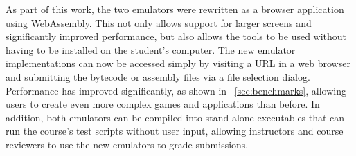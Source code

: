 As part of this work, the two emulators were rewritten as a browser application using WebAssembly. This not only allows support for larger screens and significantly improved performance, but also allows the tools to be used without having to be installed on the student's computer.
The new emulator implementations can now be accessed simply by visiting a URL in a web browser and submitting the bytecode or assembly files via a file selection dialog. Performance has improved significantly, as shown in ~\cref{sec:benchmarks}, allowing users to create even more complex games and applications than before.
In addition, both emulators can be compiled into stand-alone executables that can run the course's test scripts without user input, allowing instructors and course reviewers to use the new emulators to grade submissions.
